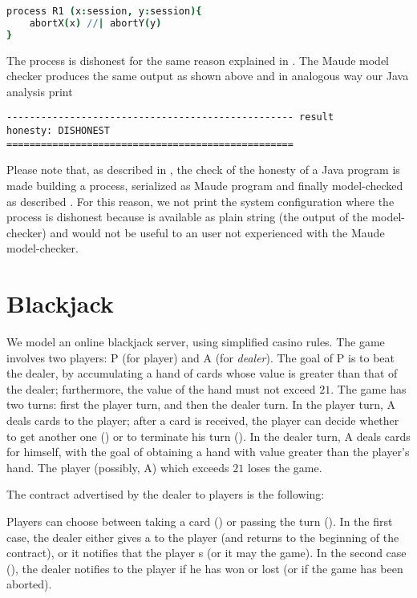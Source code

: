 \begin{lstlisting}[language=coco]
process R1 (x:session, y:session){
    abortX(x) //| abortY(y)
}
\end{lstlisting}
The process is dishonest for the same reason explained in .
The Maude model checker produces the same output as shown above and in analogous way
our Java analysis print

\begin{lstlisting}
-------------------------------------------------- result
honesty: DISHONEST
==================================================
\end{lstlisting}

Please note that, as described in , the check of the honesty of a Java program is made building a \coco process, serialized as Maude program and finally model-checked as described . For this reason, we not print the system configuration where the process is dishonest because is available as plain string (the output of the model-checker) and would not be useful to an user not experienced with the Maude model-checker.

\section{Blackjack}\label{ex:blackjack}
We model an online blackjack server, using simplified casino rules.
The game involves two players: {\pmv P} (for player) and {\pmv A} (for \emph{dealer}).
The goal of {\pmv P} is to beat the dealer, 
by accumulating a hand of cards whose value is greater than that of the dealer;
furthermore, the value of the hand must not exceed $21$.
The game has two turns: first the player turn, and then the dealer turn.
In the player turn, {\pmv A} deals cards to the player;
after a card is received, the player can decide whether to get another one
() or to terminate his turn ().
In the dealer turn, {\pmv A} deals cards for himself, with the goal
of obtaining a hand with value greater than the player's hand.
The player (possibly, {\pmv A}) which exceeds $21$ loses the game.

The contract  advertised by the dealer to players is the following:


Players can choose between taking a card () or 
passing the turn ().
In the first case, the dealer either gives a  to the player
(and returns to the beginning of the contract),
or it notifies that the player s
(or it may  the game).
In the second case (), the dealer 
notifies to the player if he has won or lost 
(or if the game has been aborted).

